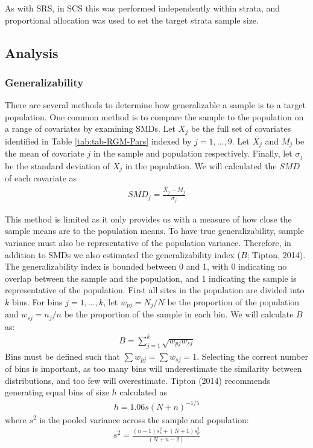 \documentclass[man,floatsintext]{apa6}
\begin{document}
As with SRS, in SCS this was performed independently within strata, and proportional allocation was used to set the target strata sample size.

\hypertarget{analysis}{%
\subsection{Analysis}\label{analysis}}

\hypertarget{generalizability}{%
\subsubsection{Generalizability}\label{generalizability}}

There are several methods to determine how generalizable a sample is to a target population. One common method is to compare the sample to the population on a range of covariates by examining SMDs. Let \(X_j\) be the full set of covariates identified in Table \ref{tab:tab-RGM-Pars} indexed by \(j = 1,...,9\). Let \(\bar{X_j}\) and \(M_j\) be the mean of covariate \(j\) in the sample and population respectively. Finally, let \(\sigma_j\) be the standard deviation of \(X_j\) in the population. We will calculated the \(SMD\) of each covariate as
\begin{align}
  SMD_{j} = \frac{\bar{X}_{j}-M_{j}}{\sigma_{j}}
\end{align}

This method is limited as it only provides us with a measure of how close the sample means are to the population means. To have true generalizability, sample variance must also be representative of the population variance. Therefore, in addition to SMDs we also estimated the generalizability index (\(B\); Tipton, 2014). The generalizability index is bounded between 0 and 1, with 0 indicating no overlap between the sample and the population, and 1 indicating the sample is representative of the population. First all sites in the population are divided into \(k\) bins. For bins \(j = 1,...,k\), let \(w_{pj} = N_j/N\) be the proportion of the population and \(w_{sj} = n_j/n\) be the proportion of the sample in each bin. We will calculate \(B\) as:
\begin{align}
  B = \sum^k_{j=1}\sqrt{w_{pj}w_{sj}}
\end{align}
Bins must be defined such that \(\sum{w_{pj}} = \sum{w_{sj}} = 1\). Selecting the correct number of bins is important, as too many bins will underestimate the similarity between distributions, and too few will overestimate. Tipton (2014) recommends generating equal bins of size \(h\) calculated as
\begin{align}
  h = 1.06s(N+n)^{-1/5}
\end{align}
where \(s^2\) is the pooled variance across the sample and population:
\begin{align}
  s^2 = \frac{(n - 1)s^2_s + (N + 1)s^2_p}{(N + n - 2)}
\end{align}
\end{document}
